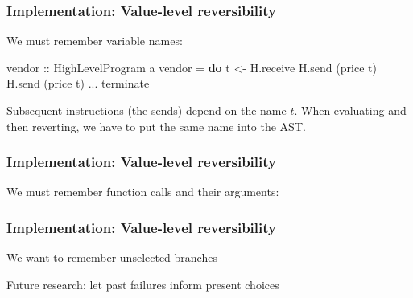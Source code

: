 \documentclass[12pt]{beamer}
\newenvironment{Shaded}{}{}
\newcommand{\KeywordTok}[1]{\textcolor[rgb]{0.00,0.44,0.13}{\textbf{#1}}}
\newcommand{\DataTypeTok}[1]{\textcolor[rgb]{0.56,0.13,0.00}{#1}}
\newcommand{\StringTok}[1]{\textcolor[rgb]{0.25,0.44,0.63}{#1}}
\newcommand{\OtherTok}[1]{\textcolor[rgb]{0.00,0.44,0.13}{#1}}
\newcommand{\FunctionTok}[1]{\textcolor[rgb]{0.02,0.16,0.49}{#1}}
\newcommand{\NormalTok}[1]{#1}
\begin{document}
\begin{frame}[fragile]
\frametitle{Implementation: Value-level reversibility}

We must remember variable names:

\begin{Shaded}
\begin{Highlighting}[]
\OtherTok{vendor ::} \DataTypeTok{HighLevelProgram}\NormalTok{ a}
\NormalTok{vendor }\FunctionTok{=} \KeywordTok{do}
\NormalTok{    t }\OtherTok{<-}\NormalTok{ H.receive}
\NormalTok{    H.send (price t) }
\NormalTok{    H.send (price t) }
    \FunctionTok{...}
\NormalTok{    terminate}
\end{Highlighting}
\end{Shaded}

Subsequent instructions (the sends) depend on the name $t$.
When evaluating and then reverting, we have to put the same name into the AST.

\end{frame}



\begin{frame}[fragile]
\frametitle{Implementation: Value-level reversibility}

We must remember function calls and their arguments:

\begin{Shaded}
\end{Shaded}

\end{frame}

\begin{frame}[fragile]
\frametitle{Implementation: Value-level reversibility}

We want to remember unselected branches

Future research: let past failures inform present choices


\end{frame}
\end{document}
